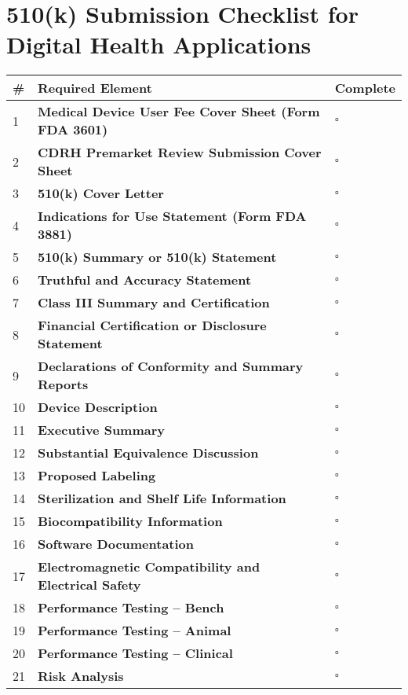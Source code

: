\section{510(k) Submission Checklist for Digital Health Applications}

\begin{tcolorbox}[title=510(k) Submission Checklist]
\begin{tabular}{|p{1cm}|p{12cm}|p{1cm}|}
\hline
\textbf{\#} & \textbf{Required Element} & \textbf{Complete} \\
\hline
1 & \textbf{Medical Device User Fee Cover Sheet (Form FDA 3601)} & $\square$ \\
\hline
2 & \textbf{CDRH Premarket Review Submission Cover Sheet} & $\square$ \\
\hline
3 & \textbf{510(k) Cover Letter} & $\square$ \\
\hline
4 & \textbf{Indications for Use Statement (Form FDA 3881)} & $\square$ \\
\hline
5 & \textbf{510(k) Summary or 510(k) Statement} & $\square$ \\
\hline
6 & \textbf{Truthful and Accuracy Statement} & $\square$ \\
\hline
7 & \textbf{Class III Summary and Certification} & $\square$ \\
\hline
8 & \textbf{Financial Certification or Disclosure Statement} & $\square$ \\
\hline
9 & \textbf{Declarations of Conformity and Summary Reports} & $\square$ \\
\hline
10 & \textbf{Device Description} & $\square$ \\
\hline
11 & \textbf{Executive Summary} & $\square$ \\
\hline
12 & \textbf{Substantial Equivalence Discussion} & $\square$ \\
\hline
13 & \textbf{Proposed Labeling} & $\square$ \\
\hline
14 & \textbf{Sterilization and Shelf Life Information} & $\square$ \\
\hline
15 & \textbf{Biocompatibility Information} & $\square$ \\
\hline
16 & \textbf{Software Documentation} & $\square$ \\
\hline
17 & \textbf{Electromagnetic Compatibility and Electrical Safety} & $\square$ \\
\hline
18 & \textbf{Performance Testing – Bench} & $\square$ \\
\hline
19 & \textbf{Performance Testing – Animal} & $\square$ \\
\hline
20 & \textbf{Performance Testing – Clinical} & $\square$ \\
\hline
21 & \textbf{Risk Analysis} & $\square$ \\
\hline
\end{tabular}


\end{tcolorbox}
